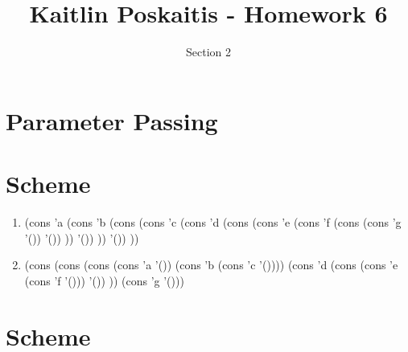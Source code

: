 \documentclass[11pt]{article}
\title{\bf Kaitlin Poskaitis - Homework 6}
\author{Section 2}
\date{}
\begin{document}
\maketitle

\section{Parameter Passing}

\section{Scheme}

\begin{enumerate}
	\item 
	(cons 'a (cons 'b 
		(cons (cons 'c (cons 'd 
			(cons (cons 'e (cons 'f 
				(cons (cons 'g '()) '())
			)) '())
		)) '()) 
	))
	\item
	(cons
		(cons 
			(cons 
				(cons 'a '())
			(cons 'b (cons 'c '())))
		(cons 'd 
			(cons (cons 'e (cons 'f '())) '())	
		))
	(cons 'g '()))

\end{enumerate}

\section{Scheme}
\end{document}
